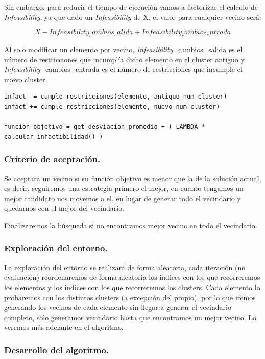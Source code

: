 \documentclass[12pt, spanish]{article}
\begin{document}
Sin embargo, para reducir el tiempo de ejecución vamos a factorizar el cálculo de \textit{Infeasibility}, ya que dado un \textit{Infeasibility} de X, el valor para cualquier vecino será:

$$X - \textit{Infeasibility}_cambios_salida + \textit{Infeasibility}_cambios_entrada$$
 
 Al solo modificar un elemento por vecino, \textit{Infeasibility}\_cambios\_salida  es el número de restricciones que incumplía dicho elemento en el cluster antiguo y \textit{Infeasibility}\_cambios\_entrada es el número de restricciones que incumple el nuevo cluster.
 
 
 
\begin{lstlisting}
infact -= cumple_restricciones(elemento, antiguo_num_cluster)
infact += cumple_restricciones(elemento, nuevo_num_cluster)

funcion_objetivo = get_desviacion_promedio + ( LAMBDA * calcular_infactibilidad() )
 \end{lstlisting}

\subsubsection{Criterio de aceptación.}

Se aceptará un vecino si su función objetivo es menor que la de la solución actual, es decir, seguiremos una estrategia primero el mejor, en cuanto tengamos un mejor candidato nos movemos a el, en lugar de generar todo el vecindario y quedarnos con el mejor del vecindario.

Finalizaremos la búsqueda si no encontramos mejor vecino en todo el vecindario.

\subsubsection{Exploración del entorno.}

La exploración del entorno se realizará de forma aleatoria, cada iteración (no evaluación) reordenaremos de forma aleatoria los indices con los que recorreremos los elementos y los indices con los que recorreremos los clusters. Cada elemento lo probaremos con los distintos clusters (a excepción del propio), por lo que iremos generando los vecinos de cada elemento sin llegar a generar el vecindario completo, solo generamos vecindario hasta que encontramos un mejor vecino. Lo veremos más adelante en el algoritmo.

\subsubsection{Desarrollo del algoritmo.}
\end{document}
